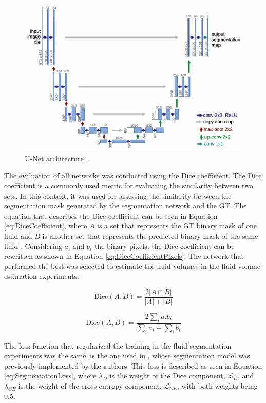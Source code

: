 \begin{figure}[!ht]
	\centering
	\includegraphics[width=0.75\linewidth]{figures/UNet}
	\caption{U-Net architecture \cite{Ronneberger2015}.}
	\label{fig:UNet}
\end{figure}

The evaluation of all networks was conducted using the Dice coefficient. The Dice coefficient is a commonly used metric for evaluating the similarity between two sets. In this context, it was used for assessing the similarity between the segmentation mask generated by the segmentation network and the GT. The equation that describes the Dice coefficient can be seen in Equation \ref{eq:DiceCoefficient}, where $A$ is a set that represents the GT binary mask of one fluid and $B$ is another set that represents the predicted binary mask of the same fluid \cite{Shamir2019}. Considering $a_{i}$ and $b_{i}$ the binary pixels, the Dice coefficient can be rewritten as shown in Equation \ref{eq:DiceCoefficientPixels}. The network that performed the best was selected to estimate the fluid volumes in the fluid volume estimation experiments.

\begin{equation}
	\text{Dice}(A, B) = \frac{2|A \cap B|}{|A| + |B|}
	\label{eq:DiceCoefficient}
\end{equation}

\begin{equation}
	\text{Dice}(A, B) = \frac{2\sum_{i} a_{i} b_{i}}{\sum_{i} a_{i} + \sum_{i} b_{i}}
	\label{eq:DiceCoefficientPixels}
\end{equation}

The loss function that regularized the training in the fluid segmentation experiments was the same as the one used in \textcite{Tennakoon2018}, whose segmentation model was previously implemented by the authors. This loss is described as seen in Equation \ref{eq:SegmentationLoss}, where $\lambda_{D}$ is the weight of the Dice component, $\mathcal{L}_{D}$, and $\lambda_{CE}$ is the weight of the cross-entropy component, $\mathcal{L}_{CE}$, with both weights being 0.5.

